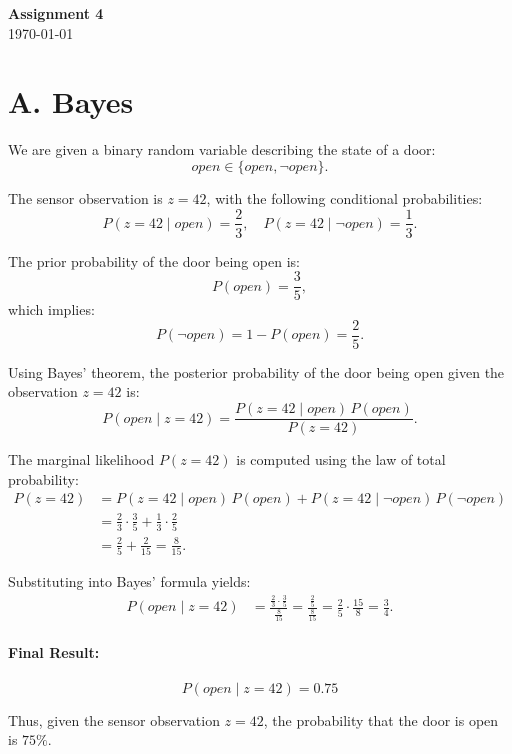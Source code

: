 \documentclass[a4paper,12pt]{article}
\begin{document}
\begin{center}
    \Large \textbf{Assignment 4} \\[6pt]
    \today
\end{center}

\section*{A. Bayes}

We are given a binary random variable describing the state of a door:
\[
open \in \{open, \neg open\}.
\]

The sensor observation is \( z = 42 \), with the following conditional probabilities:
\[
P(z=42 \mid open) = \frac{2}{3}, \quad
P(z=42 \mid \neg open) = \frac{1}{3}.
\]

The prior probability of the door being open is:
\[
P(open) = \frac{3}{5},
\]
which implies:
\[
P(\neg open) = 1 - P(open) = \frac{2}{5}.
\]

Using Bayes' theorem, the posterior probability of the door being open given the observation \( z=42 \) is:
\[
P(open \mid z=42) =
\frac{P(z=42 \mid open)\,P(open)}{P(z=42)}.
\]

The marginal likelihood \( P(z=42) \) is computed using the law of total probability:
\[
\begin{aligned}
P(z=42) &=
P(z=42 \mid open)\,P(open)
+ P(z=42 \mid \neg open)\,P(\neg open) \\
&=
\frac{2}{3}\cdot\frac{3}{5}
+ \frac{1}{3}\cdot\frac{2}{5} \\
&=
\frac{2}{5} + \frac{2}{15}
= \frac{8}{15}.
\end{aligned}
\]

Substituting into Bayes' formula yields:
\[
\begin{aligned}
P(open \mid z=42)
&=
\frac{\frac{2}{3}\cdot\frac{3}{5}}{\frac{8}{15}}
= \frac{\frac{2}{5}}{\frac{8}{15}}
= \frac{2}{5}\cdot\frac{15}{8}
= \frac{3}{4}.
\end{aligned}
\]

\paragraph{Final Result:}
\[
\boxed{P(open \mid z=42) = 0.75}
\]

Thus, given the sensor observation \( z = 42 \), the probability that the door is open is \(75\%\).



\end{document}

